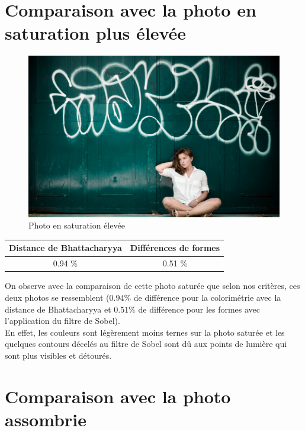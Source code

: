 \documentclass[]{article}
\begin{document}
\begin{description}
\newpage

\section{Comparaison avec la photo en saturation plus
élevée}\label{comparaison-avec-la-photo-en-saturation-plus-uxe9levuxe9e}

\begin{figure}[htbp]
\centering
\includegraphics{photos/saturate.jpg}
\caption{Photo en saturation élevée}
\end{figure}

\begin{center}
\begin{tabular}{|c|c|}
  \hline
  Distance de Bhattacharyya & Différences de formes \\
  \hline
  0.94 \% & 0.51 \% \\
  \hline
\end{tabular}
\end{center}

On observe avec la comparaison de cette photo saturée que selon nos
critères, ces deux photos se ressemblent ($0.94 \%$ de différence pour la
colorimétrie avec la distance de Bhattacharyya et $0.51 \%$ de différence
pour les formes avec l'application du filtre de Sobel).\\En effet, les
couleurs sont légèrement moins ternes sur la photo saturée et les
quelques contours décelés au filtre de Sobel sont dû aux points de
lumière qui sont plus visibles et détourés.

\newpage

\section{Comparaison avec la photo
assombrie}\label{comparaison-avec-la-photo-assombrie}


\end{description}
\end{document}
